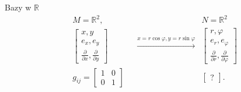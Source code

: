 \documentclass[../main.tex]{subfiles}
\begin{document}
Bazy w $\mathbb{R}$
\begin{align*}
 &M = \mathbb{R}^2, && &N = \mathbb{R}^2\\
 &\begin{bmatrix} x,y\\ e_x,e_y\\ \frac{\partial }{\partial x} , \frac{\partial }{\partial y}  \end{bmatrix} && \overset{x=r\cos\varphi, y = r\sin\varphi}{\to}& \begin{bmatrix} r,\varphi\\ e_r, e_\varphi \\ \frac{\partial }{\partial r}, \frac{\partial }{\partial \varphi}   \end{bmatrix}\\
 &g_{ij} = \begin{bmatrix} 1&0\\0&1 \end{bmatrix} &&  &\begin{bmatrix} ? \end{bmatrix}
.\end{align*}
\end{document}
